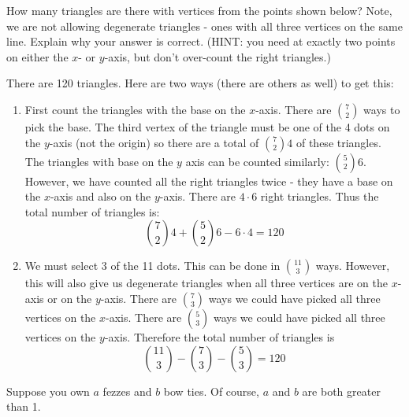 \documentclass[10pt]{exam}
\begin{document}
\begin{questions}
\question[5] How many triangles are there with vertices from the points shown below?  Note, we are not allowing degenerate triangles - ones with all three vertices on the same line.  Explain why your answer is correct. (HINT: you need at exactly two points on either the $x$- or $y$-axis, but don't over-count the right triangles.)

\begin{center}

  
\end{center}

\begin{solution}
  There are 120 triangles.  Here are two ways (there are others as well) to get this:
  
  \begin{enumerate}
    \item First count the triangles with the base on the $x$-axis.  There are ${7 \choose 2}$ ways to pick the base.  The third vertex of the triangle must be one of the 4 dots on the $y$-axis (not the origin) so there are a total of ${7 \choose 2}4$ of these triangles.  The triangles with base on the $y$ axis can be counted similarly: ${5 \choose 2}6$.  However, we have counted all the right triangles twice - they have a base on the $x$-axis and also on the $y$-axis.  There are $4 \cdot 6$ right triangles.  Thus the total number of triangles is:
    \[{7 \choose 2}4 + {5 \choose 2}6 - 6\cdot 4 = 120\]
    \item We must select 3 of the 11 dots.  This can be done in ${11 \choose 3}$ ways.  However, this will also give us degenerate triangles when all three vertices are on the $x$-axis or on the $y$-axis.  There are ${7 \choose 3}$ ways we could have picked all three vertices on the $x$-axis.  There are ${5 \choose 3}$ ways we could have picked all three vertices on the $y$-axis.  Therefore the total number of triangles is
    \[{11 \choose 3} - {7 \choose 3} - {5 \choose 3} = 120\]
  \end{enumerate}

\end{solution}

\question[6] Suppose you own $a$ fezzes and $b$ bow ties.  Of course, $a$ and $b$ are both greater than 1.
\begin{parts}

\end{parts}
\end{questions}
\end{document}
